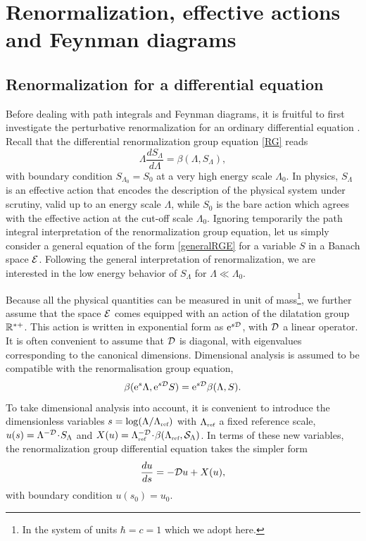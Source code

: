 \documentclass[10pt,here,feynmf]{article}
\begin{document}
\label{difftime}


\section{Renormalization, effective actions and Feynman diagrams}

\subsection{Renormalization for a differential equation}

\label{diffren}

Before dealing with path integrals and Feynman diagrams, it is fruitful to first investigate the perturbative renormalization for an ordinary differential equation \cite{GKM}. Recall that the differential renormalization group equation \eqref{RG} reads
\begin{equation}
\Lambda\frac{d
S_{\Lambda}}{d\Lambda}=\beta(\Lambda,S_\Lambda),\label{generalRGE}
\end{equation}
with boundary condition $S_{\Lambda_{0}}=S_{0}$ at a very high energy scale $\Lambda_{0}$.  In physics, $S_{\Lambda}$  is an effective  action that encodes the description of the physical system under scrutiny, valid up to an energy scale $\Lambda$, while  $S_{0}$ is the bare action which agrees with the effective action at the cut-off scale $\Lambda_{0}$. Ignoring temporarily the path integral interpretation of the renormalization group equation, let us simply consider a general equation of the form \eqref{generalRGE} for a variable $S$ in a Banach space ${\cal E}$. Following the general interpretation of renormalization, we are interested in the low energy behavior of $S_{\Lambda}$ for $\Lambda\ll \Lambda_{0}$. 

Because all the physical quantities can be measured in unit of mass\footnote{In the system of units $\hbar=c=1$ which we adopt here.}, we further assume that the space ${\cal E}$ comes equipped with an action of the dilatation group ${\Bbb R}^{\ast+}$. This action is  written in exponential form as  $\mathrm{e}^{s{\cal D}}$, with ${\cal D}$ a linear operator. It is often convenient to assume that ${\cal D}$ is diagonal, with eigenvalues corresponding to the canonical dimensions. Dimensional analysis is assumed to be compatible with the renormalisation group equation,
\begin{equation}
\beta(\mathrm{e}^{s}\Lambda,\mathrm{e}^{s{\cal D}}
S)=\mathrm{e}^{s{\cal D}}\beta(\Lambda,S).
\end{equation}
To take dimensional analysis into account, it is convenient to  introduce the dimensionless variables
$s=\log(\Lambda/\Lambda_{\mbox{\tiny ref}})$ with
$\Lambda_{\mbox{\tiny ref}}$ a fixed reference scale,
$u(s)=\Lambda^{-{\cal D}}\!\cdot\!S_{\Lambda}$ and
$X(u)={\Lambda}^{-{\cal D}}_{\mbox{\tiny
ref}}\!\cdot\!\beta({\Lambda}_{\mbox{\tiny ref}},{\cal
S}_{\Lambda})$. In terms of these new variables, the renormalization group differential equation takes the simpler form
\begin{equation}
\frac{du}{ds}=-{\cal D}u+X(u),
\end{equation}
with boundary condition $u(s_{0})=u_{0}$. 
\end{document}
